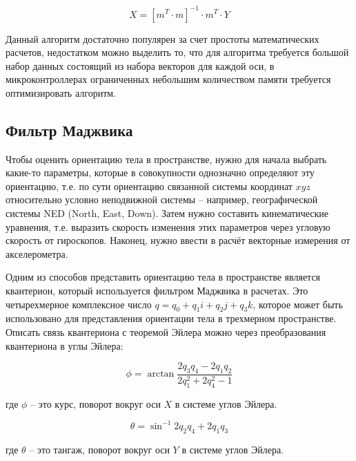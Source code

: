 \begin{equation}
    \label{eq:domain:XL_CALIB}
    X = \left[m^T \cdot m\right]^{-1}\cdot m^T \cdot Y
  \end{equation}

Данный алгоритм достаточно популярен за счет простоты математических расчетов, недостатком можно выделить то, что 
для алгоритма требуется большой набор данных состоящий из набора векторов для каждой оси, в микроконтроллерах ограниченных небольшим 
количеством памяти требуется оптимизировать алгоритм. 

\subsection{Фильтр Маджвика}

Чтобы оценить ориентацию тела в пространстве, нужно для начала выбрать какие-то параметры, 
которые в совокупности однозначно определяют эту ориентацию, т.е. по сути ориентацию связанной 
системы координат $xyz$ относительно условно неподвижной системы -- например, географической системы NED (North, East, Down). 
Затем нужно составить кинематические уравнения, т.е. выразить скорость изменения этих параметров через угловую скорость от 
гироскопов. Наконец, нужно ввести в расчёт векторные измерения от акселерометра.

Одним из способов представить ориентацию тела в пространстве является квантерион, который используется фильтром Маджвика в расчетах.
Это четырехмерное комплексное число $q=q_{0}+q_{1}i+q_{2}j+q_{3}k$, которое может быть использовано 
для представления ориентации тела в трехмерном пространстве.
Описать связь квантериона с теоремой Эйлера можно через преобразования квантериона в углы Эйлера: 

\begin{equation}
    \label{eq:domain:QtoPhi}
    \phi = \arctan{\frac{2q_{3}q_{4}-2q_{1}q_{2}}{2q_{1}^{2} + 2q_{4}^{2}-1}}
    \end{equation}
\begin{explanationx}
    \item[где] $\phi$  -- это курс, поворот вокруг оси $X$ в системе углов Эйлера.
    \end{explanationx} 

    \begin{equation}
        \label{eq:domain:QtoTheta}
        \theta = \sin^{-1}{2q_{2}q_{4}+2q_{1}q_{3}}
    \end{equation}
    \begin{explanationx}
        \item[где] $\theta$  -- это тангаж, поворот вокруг оси $Y$ в системе углов Эйлера.
    \end{explanationx} 

